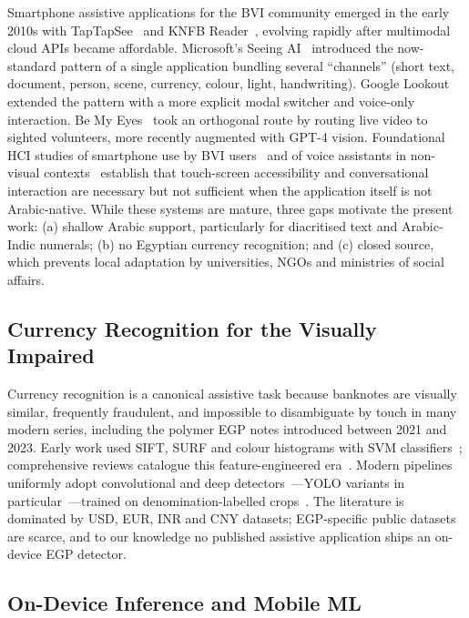 \documentclass[11pt,a4paper]{article}
\begin{document}
Smartphone assistive applications for the BVI community emerged in the
early 2010s with TapTapSee~\cite{taptapsee} and KNFB Reader~\cite{knfb_reader},
evolving rapidly after
multimodal cloud APIs became affordable. Microsoft's Seeing AI~\cite{seeingai}
introduced the now-standard pattern of a single application bundling several
``channels'' (short text, document, person, scene, currency, colour, light,
handwriting). Google Lookout~\cite{lookout} extended the pattern with a more
explicit modal switcher and voice-only interaction. Be My Eyes~\cite{bemyeyes}
took an orthogonal route by routing live video to sighted volunteers, more
recently augmented with GPT-4 vision. Foundational HCI studies of smartphone
use by BVI users~\cite{kane_blind_smartphone,branham_blind_hci} and of voice
assistants in non-visual
contexts~\cite{abdolrahmani_voice} establish that touch-screen accessibility
and conversational interaction are necessary but not sufficient when the
application itself is not Arabic-native. While these systems are mature,
three gaps motivate the present work: (a) shallow Arabic support, particularly for
diacritised text and Arabic-Indic numerals; (b) no Egyptian currency
recognition; and (c) closed source, which prevents local adaptation by
universities, NGOs and ministries of social affairs.

\subsection{Currency Recognition for the Visually Impaired}

Currency recognition is a canonical assistive task because banknotes are
visually similar, frequently fraudulent, and impossible to disambiguate by
touch in many modern series, including the polymer EGP notes introduced
between 2021 and 2023. Early work used SIFT, SURF and colour histograms with
SVM classifiers~\cite{currency_sift}; comprehensive reviews catalogue this
feature-engineered era~\cite{liu_currency_review}. Modern pipelines uniformly
adopt convolutional and deep detectors~\cite{mittal_banknote_dl}---YOLO
variants in particular~\cite{redmon_yolo,yolov8_tech}---trained on
denomination-labelled crops~\cite{currency_yolo}. The literature is
dominated by USD, EUR, INR and CNY datasets; EGP-specific public datasets
are scarce, and to our knowledge no published assistive application ships an
on-device EGP detector.

\subsection{On-Device Inference and Mobile ML}
\end{document}

